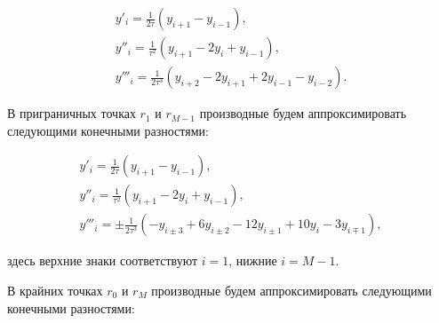 \begin{equation}

\begin{array}{l}

\displaystyle 

y'_i=\frac{1}{2\tau}(y_{i+1}-y_{i-1}),\\[2mm] 

\displaystyle 

y''_i=\frac{1}{\tau^2}(y_{i+1}-2y_i+y_{i-1}), \\[2mm]

\displaystyle 

y'''_i=\frac{1}{2\tau^3}(y_{i+2}-2y_{i+1}+2y_{i-1}-y_{i-2}). 

\end{array}

\label{eq:gotbuntov_34} 

\end{equation}



В приграничных точках $r_1$ и $r_{M-1}$ производные будем аппроксимировать  следующими конечными разностями: 

\begin{equation}

\begin{array}{l}

\displaystyle 

y'_i=\frac{1}{2\tau}(y_{i+1}-y_{i-1}), \\[2mm]

\displaystyle 

y''_i=\frac{1}{\tau^2}(y_{i+1}-2y_i+y_{i-1}),

\\[2mm]

\displaystyle 

y'''_i=\pm\frac{1}{2\tau^3}(-y_{i\pm3}+6y_{i\pm2}-12y_{i\pm1}+10y_i-3y_{i\mp1}), 

\end{array}

\label{eq:gotbuntov_35} 

\end{equation}

здесь верхние знаки соответствуют $i=1$, нижние $i=M-1$.



В крайних точках $r_0$ и $r_M$ производные будем аппроксимировать  следующими конечными разностями: 

